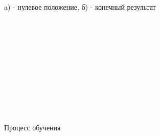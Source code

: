 \begin{figure}[h]
    \begin{minipage}[h]{0.49\linewidth}
    \end{minipage}
    \hfill
    \begin{minipage}[h]{0.49\linewidth}
    \end{minipage}
    \caption{a) - нулевое положение, б) - конечный результат}
    \label{img:result}
\end{figure}

\begin{figure}[H]
    \begin{minipage}[h]{0.4\linewidth}
          \\
    \end{minipage}
    \hfill
    \begin{minipage}[h]{0.4\linewidth}
         \\
    \end{minipage}
    \vfill
    \begin{minipage}[h]{0.4\linewidth}
         \\
    \end{minipage}
    \hfill
    \begin{minipage}[h]{0.4\linewidth}
         \\
    \end{minipage}
    \vfill
    \begin{minipage}[h]{0.4\linewidth}
          \\
    \end{minipage}
    \hfill
    \begin{minipage}[h]{0.4\linewidth}
         \\
    \end{minipage}
    \caption{Процесс обучения}
    \label{img:teaching}
\end{figure}


